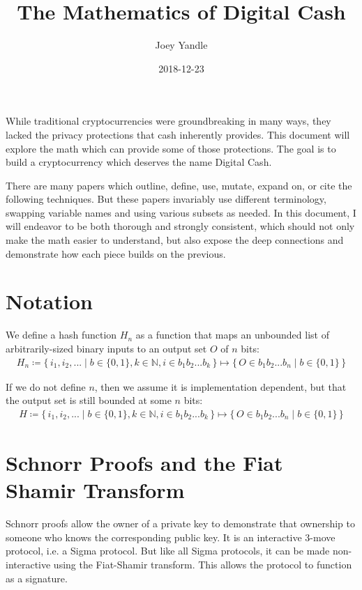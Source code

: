\documentclass{article}
\title{The Mathematics of Digital Cash}
\date{2018-12-23}
\author{Joey Yandle}
\newcommand\Set[2]{\{\,#1\mid#2\,\}}
\begin{document}
\maketitle

While traditional cryptocurrencies were groundbreaking in many ways, they lacked the privacy protections that cash inherently provides.  This document will explore the math which can provide some of those protections.  The goal is to build a cryptocurrency which deserves the name Digital Cash.

There are many papers which outline, define, use, mutate, expand on, or cite the following techniques.  But these papers invariably use different terminology, swapping variable names and using various subsets as needed.  In this document, I will endeavor to be both thorough and strongly consistent, which should not only make the math easier to understand, but also expose the deep connections and demonstrate how each piece builds on the previous.
\newpage


\section{
  Notation
}

We define a hash function $H_n$ as a function that maps an unbounded list of arbitrarily-sized binary inputs to an output set $O$ of $n$ bits:
\begin{align}
  H_n \coloneqq \Set{i_1, i_2, ...}{b \in \{0,1\}, k \in \mathbb{N}, i \in {b_1b_2...b_k}} \mapsto \Set{O \in {b_1b_2...b_n}}{b \in \{0,1\}}
\end{align}

If we do not define $n$, then we assume it is implementation dependent, but that the output set is still bounded at some $n$ bits:
\begin{align}
  H \coloneqq \Set{i_1, i_2, ...}{b \in \{0,1\}, k \in \mathbb{N}, i \in {b_1b_2...b_k}} \mapsto \Set{O \in {b_1b_2...b_n}}{b \in \{0,1\}}  
\end{align}


\section{
  Schnorr Proofs and the Fiat Shamir Transform
}

Schnorr proofs allow the owner of a private key to demonstrate that ownership to someone who knows the corresponding public key.  It is an interactive 3-move protocol, i.e. a Sigma protocol.  But like all Sigma protocols, it can be made non-interactive using the Fiat-Shamir transform.  This allows the protocol to function as a signature.
\end{document}
